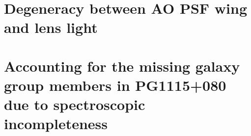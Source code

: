 \documentclass[useAMS,usenatbib]{mnras}
\begin{document}









\appendix
\section{Degeneracy between AO PSF wing and lens light}
\label{Degeneracy}


\section{Accounting for the missing galaxy group members in PG1115+080 due to spectroscopic incompleteness}
\label{missinggroup_PG1115}
\end{document}
